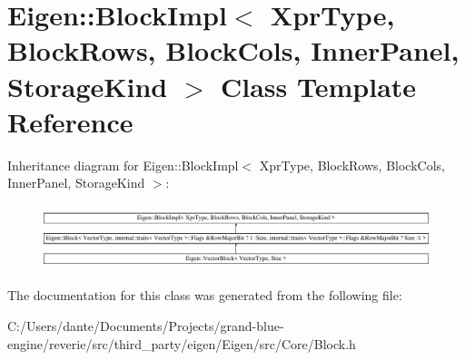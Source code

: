 \hypertarget{class_eigen_1_1_block_impl}{}\section{Eigen\+::Block\+Impl$<$ Xpr\+Type, Block\+Rows, Block\+Cols, Inner\+Panel, Storage\+Kind $>$ Class Template Reference}
\label{class_eigen_1_1_block_impl}
Inheritance diagram for Eigen\+::Block\+Impl$<$ Xpr\+Type, Block\+Rows, Block\+Cols, Inner\+Panel, Storage\+Kind $>$\+:\begin{figure}[H]
\begin{center}
\leavevmode
\includegraphics[height=1.902605cm]{class_eigen_1_1_block_impl}
\end{center}
\end{figure}


The documentation for this class was generated from the following file\+:\begin{DoxyCompactItemize}
\item 
C\+:/\+Users/dante/\+Documents/\+Projects/grand-\/blue-\/engine/reverie/src/third\+\_\+party/eigen/\+Eigen/src/\+Core/Block.\+h\end{DoxyCompactItemize}
